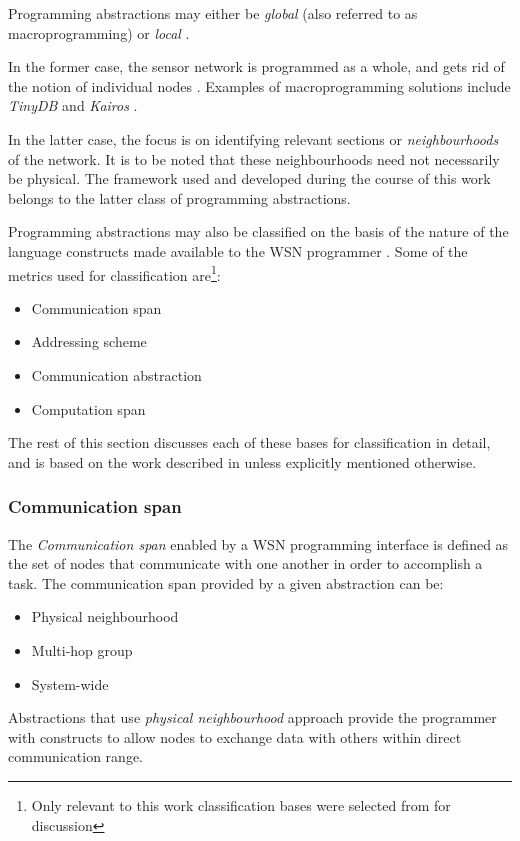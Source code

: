 Programming abstractions may either be \emph{global} (also referred to 
as macroprogramming) or \emph{local} \cite{hadim_middleware:2006}. 

In the former case, the sensor network is programmed as a whole, and gets rid of
the notion of individual nodes \cite{mottola_middleware:2008}. Examples of
macroprogramming solutions include \emph{TinyDB} \cite{madden_TinyDB:2005} and
\emph{Kairos} \cite{gummadi_Kairos:2005}. 

In the latter case, the focus is on identifying relevant sections or
\emph{neighbourhoods} of the network. It is to be noted that these neighbourhoods
need not necessarily be physical. The framework used and developed during the
course of this work belongs to the latter class of programming abstractions.

Programming abstractions may also be classified on the basis of the
nature of the language constructs made available to the WSN programmer
\cite{mottola_middleware:2008}. Some of the metrics used for classification
are\footnote{Only relevant to this work classification bases
were selected from \cite{mottola_middleware:2008} for discussion}:

\begin{itemize}
  \item Communication span
  \item Addressing scheme
  \item Communication abstraction
  \item Computation span
\end{itemize}

The rest of this section discusses each of these bases for classification in
detail, and is based on the work described in \cite{mottola_middleware:2008}
unless explicitly mentioned otherwise.

\subsubsection{Communication span}

The \emph{Communication span} enabled by a WSN programming interface is defined
as the set of nodes that communicate with one another in order to accomplish a
task. The communication span provided by a given abstraction can be:
\begin{itemize}
  \item Physical neighbourhood
  \item Multi-hop group
  \item System-wide
  
\end{itemize}
Abstractions that use \emph{physical neighbourhood} approach provide
  the programmer with constructs to allow nodes to exchange data with others
  within direct communication range.
  
